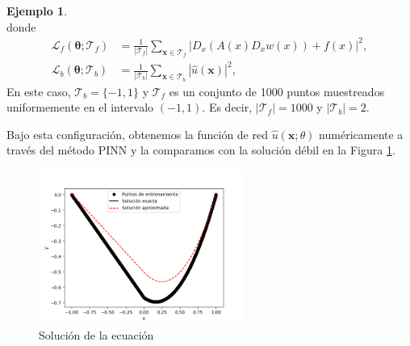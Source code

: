 \documentclass[a4paper,11pt,spanish, twoside, leqno]{tfg-uam}
\theoremstyle{definition}
\newtheorem{exmp}[teor]{Ejemplo}
\begin{document}
\begin{mdframed}
\begin{exmp}
\begin{equation*}
        \end{equation*}
        donde
        \begin{align*}
            \mathcal{L}_f(\boldsymbol{\theta}; \mathcal{T}_f) &= \frac{1}{|\mathcal{T}_f|} \sum_{\mathbf{x} \in \mathcal{T}_f} |D_{x}(A(x)D_{x} w(x))+f(x)|^2, \\ 
            \mathcal{L}_b(\boldsymbol{\theta}; \mathcal{T}_b) &= \frac{1}{|\mathcal{T}_b|} \sum_{\mathbf{x} \in \mathcal{T}_b} |\hat{u} (\mathbf{x})|^2,
        \end{align*}
        En este caso, $\mathcal{T}_b=\{-1,1\}$ y $\mathcal{T}_f$ es un conjunto de 1000 puntos muestreados uniformemente en el intervalo $(-1,1)$. Es decir, $|\mathcal{T}_f|=1000$ y $|\mathcal{T}_b|=2$.

        Bajo esta configuración, obtenemos la función de red $\hat{u}(\mathbf{x};\theta)$ numéricamente a través del método PINN y la comparamos con la solución débil en la Figura \ref{fig:deviation}. 

        \begin{figure}[H] 
            \centering
            \includegraphics[width=0.6\textwidth]{Figuras/fallo_edp_pinn.png}
            \caption{Solución de la ecuación}
            \label{fig:deviation}
        \end{figure}


\end{exmp}
\end{mdframed}
\end{document}
